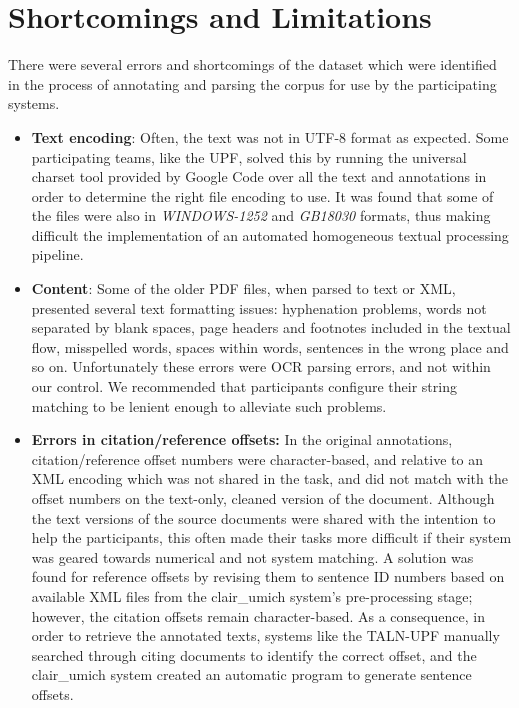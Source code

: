 \documentclass[11pt]{article}
\begin{document}
\section{Shortcomings and Limitations}
\label{sec:limitations}
There were several errors and shortcomings of the dataset which were identified in the process of annotating and parsing the corpus for use by the participating systems. 
\begin{itemize}
\item \textbf{Text encoding}: Often, the text was not in UTF-8 format as expected. Some participating teams, like the UPF, solved this by running the universal charset tool provided by Google Code over all the text and annotations in order to determine the right file encoding to use. It was found that some of the files were also in \textit{WINDOWS-1252} and \textit{GB18030} formats, thus making difficult the implementation of an automated homogeneous textual processing pipeline.
\vspace{-.3cm}
\item \textbf{Content}: Some of the older PDF files, when parsed to text or XML, presented several text formatting issues: hyphenation problems, words not separated by blank spaces, page headers and footnotes included in the textual flow, misspelled words, spaces within words, sentences in the wrong place and so on. Unfortunately these errors were OCR parsing errors, and not within our control. We recommended that  participants configure their string matching to be lenient enough to alleviate such problems.
\vspace{-.3cm}
\item \textbf{Errors in citation/reference offsets:} In the original annotations, citation/reference offset numbers were character-based, and relative to an XML encoding which was not shared in the task, and did not match with the offset numbers on the text-only, cleaned version of the document. Although the text versions of the source documents were shared with the intention to help the participants, this often made their tasks more difficult if their system was geared towards numerical and not system matching. A solution was found for reference offsets by revising them to sentence ID numbers based on available XML files from the clair\_umich system's pre-processing stage; however, the citation offsets remain character-based. As a consequence, in order to retrieve the annotated texts, systems like the TALN-UPF manually searched through citing documents to identify the correct offset, and the clair\_umich system created an automatic program to generate sentence offsets. 

\end{itemize}
\end{document}
